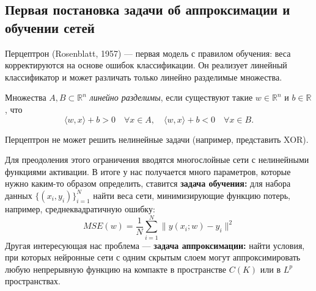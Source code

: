 \documentclass[../NDCNNAI_main.tex]{subfiles}
\begin{document}
\subsection{Первая постановка задачи об аппроксимации и обучении сетей}
Перцептрон (Rosenblatt, 1957) --- первая модель с правилом обучения: веса корректируются на основе ошибок классификации.
Он реализует линейный классификатор и может различать только линейно разделимые множества.

\begin{definition}
    Множества $A, B \subset \mathbb{R}^n$ \emph{линейно разделимы}, если существуют такие $w \in \mathbb{R}^n$ и $b \in \mathbb{R}$, что
    $$ \langle w, x \rangle + b > 0 \quad \forall x \in A, \quad \langle w, x \rangle + b < 0 \quad \forall x \in B. $$
\end{definition}

\begin{remark}
    Перцептрон не может решить нелинейные задачи (например, представить XOR).
\end{remark}

Для преодоления этого ограничения вводятся многослойные сети с нелинейными функциями активации.
В итоге у нас получается много параметров, которые нужно каким-то образом определить, ставится \textbf{задача обучения:} для набора данных $\{(x_i, y_i)\}_{i=1}^N$ найти веса сети, минимизирующие функцию потерь, например, среднеквадратичную ошибку:
$$MSE(w) = \frac{1}{N} \sum_{i=1}^N \| y(x_i; w) - y_i \|^2$$
Другая интересующая нас проблема --- \textbf{задача аппроксимации:} найти условия, при которых нейронные сети с одним скрытым слоем могут аппроксимировать любую непрерывную функцию на компакте в пространстве $C(K)$ или в $L^p$ пространствах.
\end{document}
